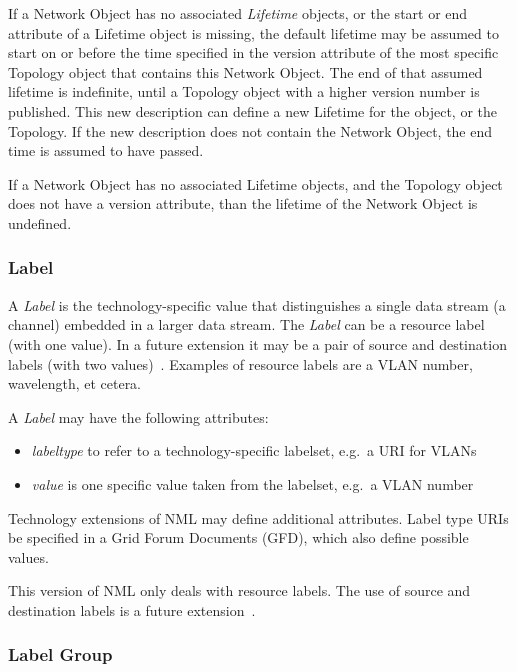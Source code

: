 If a Network Object has no associated \emph{Lifetime} objects, or the start or end attribute of a Lifetime object is missing, the default lifetime may be assumed to start on or before the time specified in the version attribute of the most specific Topology object that contains this Network Object. The end of that assumed lifetime is indefinite, until a Topology object with a higher version number is published. This new description can define a new Lifetime for the object, or the Topology. If the new description does not contain the Network Object, the end time is assumed to have passed.

If a Network Object has no associated Lifetime objects, and the Topology object does not have a version attribute, than the lifetime of the Network Object is undefined.



\subsubsection{Label}%
\label{class:label}

A \emph{Label} is the technology-specific value that distinguishes a single data stream (a channel) embedded in a larger data stream. The \emph{Label} can be a resource label (with one value). In a future extension it may be a pair of source and destination labels (with two values)~\cite{g800}. Examples of resource labels are a VLAN number, wavelength, et cetera.

A \emph{Label} may have the following attributes:
\begin{itemize}
    \item \emph{labeltype} to refer to a technology-specific labelset, e.g.\ a URI for VLANs
    \item \emph{value} is one specific value taken from the labelset, e.g.\ a VLAN number
\end{itemize}

Technology extensions of NML may define additional attributes. Label type URIs \SHOULD{} be specified in a Grid Forum Documents (GFD), which \SHOULD{} also define possible values.

This version of NML only deals with resource labels. The use of source and destination labels is a future extension~\cite{nml-experimental}.




\subsubsection{Label Group}%
\label{class:label_group}


